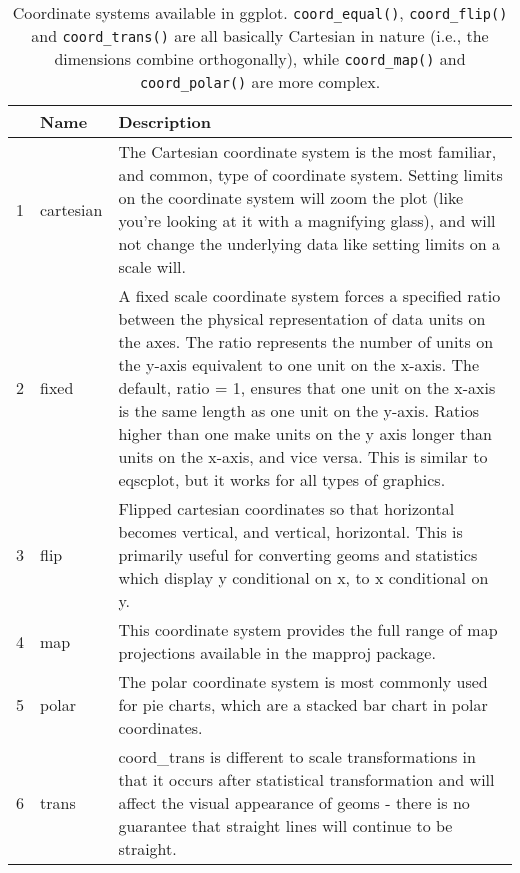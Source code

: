 \begin{table}[ht]
\centering
\begin{tabular}{rll}
  \hline
 & Name & Description \\ 
  \hline
1 & cartesian & The Cartesian coordinate system is the most familiar, and common, type of coordinate system. Setting limits on the coordinate system will zoom the plot (like you're looking at it with a magnifying glass), and will not change the underlying data like setting limits on a scale will. \\ 
  2 & fixed & A fixed scale coordinate system forces a specified ratio between the physical representation of data units on the axes. The ratio represents the number of units on the y-axis equivalent to one unit on the x-axis. The default, ratio = 1, ensures that one unit on the x-axis is the same length as one unit on the y-axis. Ratios higher than one make units on the y axis longer than units on the x-axis, and vice versa. This is similar to eqscplot, but it works for all types of graphics. \\ 
  3 & flip & Flipped cartesian coordinates so that horizontal becomes vertical, and vertical, horizontal. This is primarily useful for converting geoms and statistics which display y conditional on x, to x conditional on y. \\ 
  4 & map & This coordinate system provides the full range of map projections available in the mapproj package. \\ 
  5 & polar & The polar coordinate system is most commonly used for pie charts, which are a stacked bar chart in polar coordinates. \\ 
  6 & trans & coord\_trans is different to scale transformations in that it occurs after statistical transformation and will affect the visual appearance of geoms - there is no guarantee that straight lines will continue to be straight. \\ 
   \hline
\end{tabular}
\caption{Coordinate systems available in ggplot. 
\texttt{coord_equal()}, \texttt{coord_flip()} and \texttt{coord_trans()} 
are all basically Cartesian in nature (i.e., the dimensions combine orthogonally), 
while \texttt{coord_map()} and \texttt{coord_polar()} are more complex.} 
\label{coord}
\end{table}
